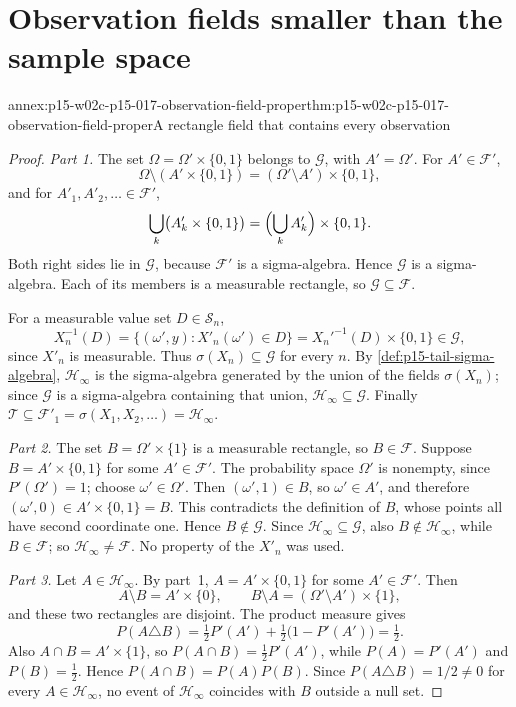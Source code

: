 \section{Observation fields smaller than the sample space}
\label{sec:annex-p15-w02c-p15-017-observation-fields}

\begin{annexitem}{annex:p15-w02c-p15-017-observation-field-proper}{thm:p15-w02c-p15-017-observation-field-proper}{A rectangle field that contains every observation}
\begin{proof}
\emph{Part 1.} The set \(\Omega=\Omega'\times\{0,1\}\) belongs to
\(\mathcal G\), with \(A'=\Omega'\). For \(A'\in\mathcal F'\),
\[
 \Omega\setminus(A'\times\{0,1\})=(\Omega'\setminus A')\times\{0,1\},
\]
and for \(A'_1,A'_2,\ldots\in\mathcal F'\),
\[
 \bigcup_k\bigl(A'_k\times\{0,1\}\bigr)
 =\Bigl(\bigcup_kA'_k\Bigr)\times\{0,1\}.
\]
Both right sides lie in \(\mathcal G\), because \(\mathcal F'\) is a
sigma-algebra. Hence \(\mathcal G\) is a sigma-algebra. Each of its
members is a measurable rectangle, so \(\mathcal G\subseteq\mathcal F\).

For a measurable value set \(D\in\mathcal S_n\),
\[
 X_n^{-1}(D)=\{(\omega',y):X'_n(\omega')\in D\}
 =X_n'^{-1}(D)\times\{0,1\}\in\mathcal G,
\]
since \(X'_n\) is measurable. Thus \(\sigma(X_n)\subseteq\mathcal G\) for
every \(n\). By \cref{def:p15-tail-sigma-algebra},
\(\mathcal H_\infty\) is the sigma-algebra generated by the union of the
fields \(\sigma(X_n)\); since \(\mathcal G\) is a sigma-algebra containing
that union, \(\mathcal H_\infty\subseteq\mathcal G\). Finally
\(\mathcal T\subseteq\mathcal F'_1=\sigma(X_1,X_2,\ldots)=\mathcal H_\infty\).

\emph{Part 2.} The set \(B=\Omega'\times\{1\}\) is a measurable
rectangle, so \(B\in\mathcal F\). Suppose \(B=A'\times\{0,1\}\) for some
\(A'\in\mathcal F'\). The probability space \(\Omega'\) is nonempty,
since \(P'(\Omega')=1\); choose \(\omega'\in\Omega'\). Then
\((\omega',1)\in B\), so \(\omega'\in A'\), and therefore
\((\omega',0)\in A'\times\{0,1\}=B\). This contradicts the definition of
\(B\), whose points all have second coordinate one. Hence
\(B\notin\mathcal G\). Since \(\mathcal H_\infty\subseteq\mathcal G\), also
\(B\notin\mathcal H_\infty\), while \(B\in\mathcal F\); so
\(\mathcal H_\infty\neq\mathcal F\). No property of the \(X'_n\) was used.

\emph{Part 3.} Let \(A\in\mathcal H_\infty\). By part~1,
\(A=A'\times\{0,1\}\) for some \(A'\in\mathcal F'\). Then
\[
 A\setminus B=A'\times\{0\},\qquad
 B\setminus A=(\Omega'\setminus A')\times\{1\},
\]
and these two rectangles are disjoint. The product measure gives
\[
 P(A\triangle B)
 =\tfrac12P'(A')+\tfrac12\bigl(1-P'(A')\bigr)=\tfrac12 .
\]
Also \(A\cap B=A'\times\{1\}\), so
\(P(A\cap B)=\tfrac12P'(A')\), while \(P(A)=P'(A')\) and
\(P(B)=\tfrac12\). Hence \(P(A\cap B)=P(A)P(B)\). Since
\(P(A\triangle B)=1/2\neq0\) for every \(A\in\mathcal H_\infty\), no event
of \(\mathcal H_\infty\) coincides with \(B\) outside a null set.


\end{proof}
\end{annexitem}
